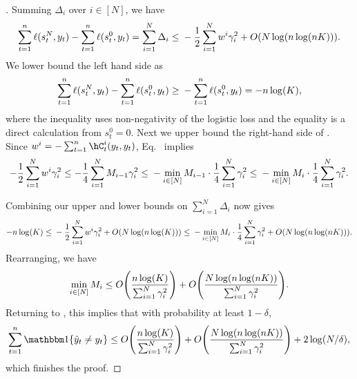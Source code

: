 \begin{proof}[]
Summing $\Delta_{i}$ over $i\in [N]$, we have
\begin{equation}
\label{eq:delta_sum}
\sum_{t=1}^{n}\ls(s_{t}^{N}, y_t) - \sum_{t=1}^{n}\ls(s_{t}^{0}, y_t)  = \sum_{i=1}^{N}\Delta_i
\leq{} -\frac{1}{2}\sum_{i=1}^{N}w^{i}\gamma_{i}^{2} + O(N\log(n\log(nK))).
\end{equation}
We lower bound the left hand side as
\[
\sum_{t=1}^{n}\ls(s_{t}^{N}, y_t) - \sum_{t=1}^{n}\ls(s_{t}^{0}, y_t)
\geq{} - \sum_{t=1}^{n}\ls(s_{t}^{0}, y_t) = -n\log(K),
\]
where the inequality uses non-negativity of the logistic loss and the equality is a direct calculation from $s_{t}^{0}=0$.
Next we upper bound the right-hand side of . Since $w^{i}=-\sum_{t=1}^{n}\hC_{t}^{i}(y_t, y_t)$, Eq.~ implies
\begin{align*}
-\frac{1}{2}\sum_{i=1}^{N}w^{i}\gamma_{i}^{2} 
\leq  -\frac{1}{4}\sum_{i=1}^{N}M_{i-1}\gamma_{i}^{2} 
\leq{} -\min_{i\in\brk*{N}}M_{i-1}\cdot\frac{1}{4}\sum_{i=1}^{N}\gamma_{i}^{2} 
\leq{} -\min_{i\in\brk*{N}}M_{i}\cdot\frac{1}{4}\sum_{i=1}^{N}\gamma_{i}^{2}.
\end{align*}

Combining our upper and lower bounds on $\sum_{i=1}^{N}\Delta_{i}$ now gives
\begin{equation}
\label{eq:multiclass_boosting_combined}
-n\log(K) \leq{} -\frac{1}{2}\sum_{i=1}^{N}w^{i}\gamma_{i}^{2} + O(N\log(n\log(K)))\leq{} -\min_{i\in\brk*{N}}M_{i}\cdot\frac{1}{4}\sum_{i=1}^{N}\gamma_{i}^{2} + O(N\log(n\log(nK))).
\end{equation}
Rearranging, we have
\[
\min_{i\in\brk*{N}}M_{i} \leq{} O\prn*{\frac{n\log(K)}{\sum_{i=1}^{N}\gamma_{i}^{2}}} + O\prn*{\frac{N\log(n\log(nK))}{\sum_{i=1}^{N}\gamma_{i}^{2}}}.
\]
Returning to , this implies that with probability at least $1-\delta$,
\[
\sum_{t=1}^{n}\ind\crl*{\yh_{t}\neq{}y_t} \leq{} O\prn*{\frac{n\log(K)}{\sum_{i=1}^{N}\gamma_{i}^{2}}} + O\prn*{\frac{N\log(n\log(nK))}{\sum_{i=1}^{N}\gamma_{i}^{2}}} + 2\log(N/\delta),
\]
which finishes the proof.
\end{proof}

